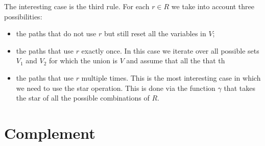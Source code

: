 \documentclass[letterpaper,11pt]{article}
\begin{document}
The interesting case is the third rule. 
For each $r\in R$ we take into account three possibilities:
\begin{itemize}
\item the paths that do not use $r$ but still reset all the variables in $V$;
\item the paths that use $r$ exactly once. In this case we iterate over all possible sets $V_1$ and $V_2$ for which the union is $V$ and assume that
		all the  that th
\item the paths that use $r$ multiple times. This is the most interesting case in which we need to use the star operation. This is done via the function $\gamma$
		that takes the star of all the possible combinations of $R$.
\end{itemize}
\section{Complement}

\cite{jurg14}



\end{document}
